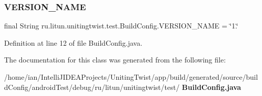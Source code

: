 \subsubsection{V\+E\+R\+S\+I\+O\+N\+\_\+\+N\+A\+ME}
{\footnotesize\ttfamily final String ru.\+litun.\+unitingtwist.\+test.\+Build\+Config.\+V\+E\+R\+S\+I\+O\+N\+\_\+\+N\+A\+ME = \char`\"{}1.\char`\"{}\hspace{0.3cm}{\ttfamily [static]}}



Definition at line 12 of file Build\+Config.\+java.



The documentation for this class was generated from the following file\+:\begin{DoxyCompactItemize}
\item 
/home/ian/\+Intelli\+J\+I\+D\+E\+A\+Projects/\+Uniting\+Twist/app/build/generated/source/build\+Config/android\+Test/debug/ru/litun/unitingtwist/test/\textbf{ Build\+Config.\+java}\end{DoxyCompactItemize}
